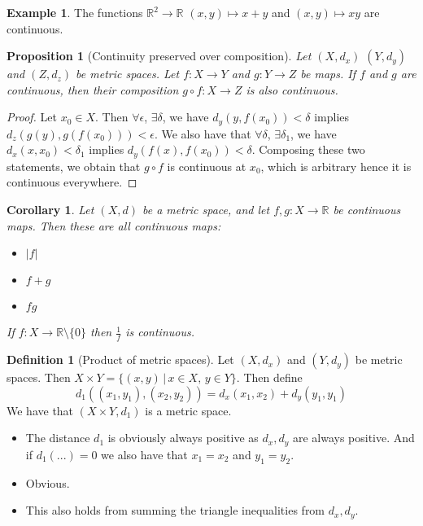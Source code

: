 \documentclass{article}
\theoremstyle{definition}
\newtheorem{defn}{Definition}[section]
\newtheorem{exmp}{Example}[section]
\theoremstyle{plain}%
\newtheorem{prop}[thm]{Proposition}
\newtheorem*{cor}{Corollary}
\theoremstyle{remark}
\begin{document}
\begin{exmp}
The functions $\mathbb{R}^2 \to \mathbb{R}$ $(x,y) \mapsto x+y$ and $(x,y) \mapsto xy$ are continuous.
\end{exmp}

\begin{prop}[Continuity preserved over composition]\label{continuity_over_comp}
Let $(X, d_x)$ $(Y,d_y)$ and $(Z,d_z)$ be metric spaces. Let $f:X \to Y$ and $g:Y \to Z$ be maps. If $f$ and $g$ are continuous, then their composition $g \circ f : X \to Z$ is also continuous.
\end{prop}

\begin{proof}
Let $x_0 \in X$. Then $\forall \epsilon$, $\exists \delta$, we have $d_y(y, f(x_0)) < \delta$ implies $d_z(g(y), g(f(x_0))) < \epsilon$. We also have that $\forall \delta$, $\exists \delta_1$, we have $d_x(x, x_0) < \delta_1$ implies $d_y(f(x), f(x_0)) < \delta$. Composing these two statements, we obtain that $g \circ f$ is continuous at $x_0$, which is arbitrary hence it is continuous everywhere.
\end{proof}

\begin{cor}
Let $(X,d)$ be a metric space, and let $f, g:X \to \mathbb{R}$ be continuous maps. Then these are all continuous maps:

\begin{itemize}
    \item $|f|$
    \item $f+g$
    \item $fg$
\end{itemize}

\begin{flushleft}
If $f:X \to \mathbb{R}\setminus\{0\}$ then $\frac{1}{f}$ is continuous.
\end{flushleft}

\end{cor}

\begin{defn}[Product of metric spaces]
Let $(X,d_x)$ and $(Y,d_y)$ be metric spaces. Then $X \times Y = \{(x,y) \, | \, x \in X, \, y \in Y\}$. Then define \[d_1((x_1,y_1), (x_2,y_2)) = d_x(x_1, x_2) + d_y(y_1,y_1)\] We have that $(X \times Y, d_1)$ is a metric space.
\end{defn}

\begin{flushleft}
\begin{itemize}
    \item The distance $d_1$ is obviously always positive as $d_x, d_y$ are always positive. And if $d_1 (...) = 0$ we also have that $x_1=x_2$ and $y_1=y_2$. \checkmark
    \item Obvious. \checkmark
    \item This also holds from summing the triangle inequalities from $d_x, d_y$. \checkmark
\end{itemize}
\end{flushleft}
\end{document}
